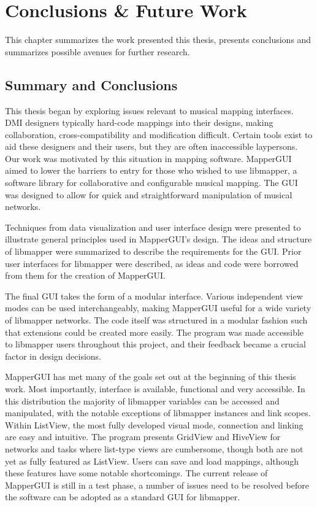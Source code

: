 \chapter{Conclusions \& Future Work}

This chapter summarizes the work presented this thesis, presents conclusions and summarizes possible avenues for further research.

\section{Summary and Conclusions}

This thesis began by exploring issues relevant to musical mapping interfaces. DMI designers typically hard-code mappings into their designs, making collaboration, cross-compatibility and modification difficult. Certain tools exist to aid these designers and their users, but they are often inaccessible laypersons. Our work was motivated by this situation in mapping software. MapperGUI aimed to lower the barriers to entry for those who wished to use libmapper, a software library for collaborative and configurable musical mapping. The GUI was designed to allow for quick and straightforward manipulation of musical networks. 

Techniques from data visualization and user interface design were presented to illustrate general principles used in MapperGUI's design. The ideas and structure of libmapper were summarized to describe the requirements for the GUI. Prior user interfaces for libmapper were described, as ideas and code were borrowed from them for the creation of MapperGUI.

The final GUI takes the form of a modular interface. Various independent view modes can be used interchangeably, making MapperGUI useful for a wide variety of libmapper networks. The code itself was structured in a modular fashion such that extensions could be created more easily. The program was made accessible to libmapper users throughout this project, and their feedback became a crucial factor in design decisions. 

MapperGUI has met many of the goals set out at the beginning of this thesis work. Most importantly, interface is available, functional and very accessible. In this distribution the majority of libmapper variables can be accessed and manipulated, with the notable exceptions of libmapper instances and link scopes. Within ListView, the most fully developed visual mode, connection and linking are easy and intuitive. The program presents GridView and HiveView for networks and tasks where list-type views are cumbersome, though both are not yet as fully featured as ListView. Users can save and load mappings, although these features have some notable shortcomings. The current release of MapperGUI is still in a test phase, a number of issues need to be resolved before the software can be adopted as a standard GUI for libmapper. 

